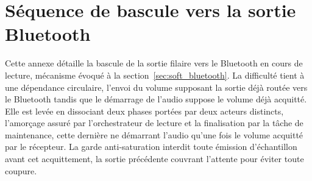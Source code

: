 \chapter{Séquence de bascule vers la sortie Bluetooth}
\label{ann:bascule-bt}

Cette annexe détaille la bascule de la sortie filaire vers le Bluetooth en cours de lecture, mécanisme évoqué à la section~\ref{sec:soft_bluetooth}. La difficulté tient à une dépendance circulaire, l'envoi du volume supposant la sortie déjà routée vers le Bluetooth tandis que le démarrage de l'audio suppose le volume déjà acquitté. Elle est levée en dissociant deux phases portées par deux acteurs distincts, l'amorçage assuré par l'orchestrateur de lecture et la finalisation par la tâche de maintenance, cette dernière ne démarrant l'audio qu'une fois le volume acquitté par le récepteur. La garde anti-saturation interdit toute émission d'échantillon avant cet acquittement, la sortie précédente couvrant l'attente pour éviter toute coupure.

